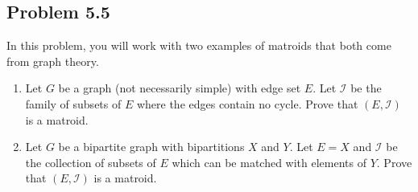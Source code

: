 \documentclass[12pt]{article}
\begin{document}
\newpage 

\subsection{Problem 5.5}

\begin{problem}
	In this problem, you will work with two examples of matroids that both come from graph theory. 
    \begin{enumerate}[label = (\alph*)]
        \item Let $G$ be a graph (not necessarily simple) with edge set $E$. Let $\mathcal{I}$ be the family of subsets of $E$ where the edges contain no cycle. Prove that $(E, \mathcal{I})$ is a matroid.
        \item Let $G$ be a bipartite graph with bipartitions $X$ and $Y$. Let $E = X$ and $\mathcal{I}$ be the collection of subsets of $E$ which can be matched with elements of $Y$. Prove that $(E, \mathcal{I})$ is a matroid. 
    \end{enumerate}
\end{problem}
\end{document}
